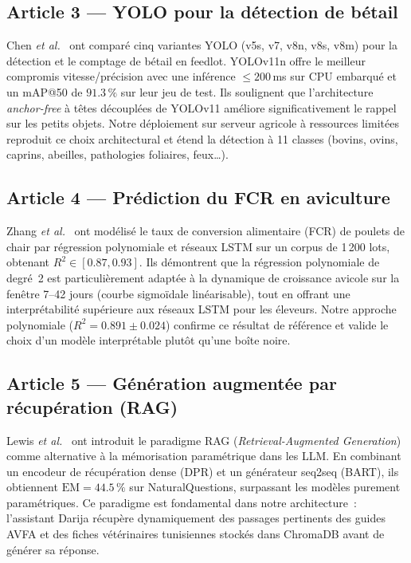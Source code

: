 \subsection*{Article 3 --- YOLO pour la détection de bétail}

Chen \textit{et al.}~\cite{chen2023yolo_livestock} ont comparé cinq variantes YOLO
(v5s, v7, v8n, v8s, v8m) pour la détection et le comptage de bétail en feedlot.
YOLOv11n offre le meilleur compromis vitesse/précision avec une inférence
$\leq 200$\,ms sur CPU embarqué et un mAP@50 de $91.3\,\%$ sur leur jeu de test.
Ils soulignent que l'architecture \textit{anchor-free} à têtes découplées de YOLOv11
améliore significativement le rappel sur les petits objets.
Notre déploiement sur serveur agricole à ressources limitées reproduit ce choix
architectural et étend la détection à 11 classes (bovins, ovins, caprins,
abeilles, pathologies foliaires, feux\ldots).

\subsection*{Article 4 --- Prédiction du FCR en aviculture}

Zhang \textit{et al.}~\cite{zhang2023fcr} ont modélisé le taux de conversion
alimentaire (FCR) de poulets de chair par régression polynomiale et réseaux LSTM
sur un corpus de 1\,200 lots, obtenant $R^2 \in [0.87, 0.93]$.
Ils démontrent que la régression polynomiale de degré~2 est particulièrement adaptée
à la dynamique de croissance avicole sur la fenêtre 7--42 jours (courbe sigmoïdale
linéarisable), tout en offrant une interprétabilité supérieure aux réseaux LSTM
pour les éleveurs.
Notre approche polynomiale ($R^2 = 0.891 \pm 0.024$) confirme ce résultat de
référence et valide le choix d'un modèle interprétable plutôt qu'une boîte noire.

\subsection*{Article 5 --- Génération augmentée par récupération (RAG)}

Lewis \textit{et al.}~\cite{lewis2020rag} ont introduit le paradigme RAG
(\textit{Retrieval-Augmented Generation}) comme alternative à la mémorisation
paramétrique dans les LLM. En combinant un encodeur de récupération dense (DPR)
et un générateur seq2seq (BART), ils obtiennent $\text{EM} = 44.5\,\%$
sur NaturalQuestions, surpassant les modèles purement paramétriques.
Ce paradigme est fondamental dans notre architecture~: l'assistant Darija
récupère dynamiquement des passages pertinents des guides AVFA et des fiches
vétérinaires tunisiennes stockés dans ChromaDB avant de générer sa réponse.

